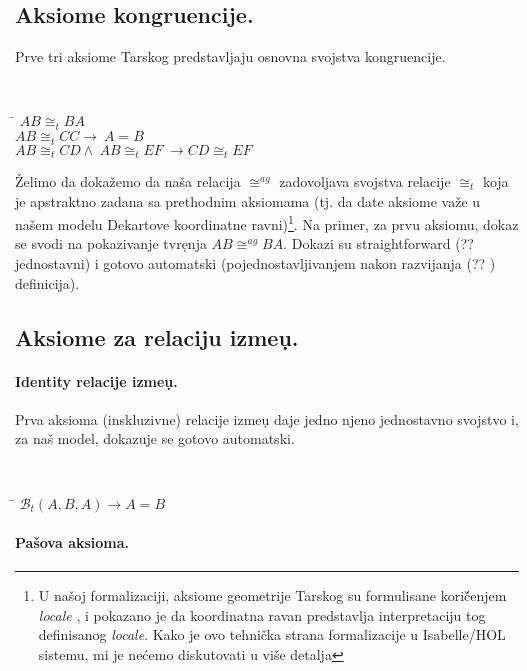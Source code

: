\documentclass[a4paper, 12pt]{article}
\newcommand{\agcongr}[4]{\ensuremath{#1#2 \cong^{ag} #3#4}}
\newcommand{\bett}[3]{\ensuremath{\mathcal{B}_t(#1, #2, #3)}}
\newcommand{\congrt}[4]{\ensuremath{#1#2 \cong_t #3#4}}
\begin{document}
\subsection{Aksiome kongruencije.}

Prve tri aksiome Tarskog predstavljaju osnovna svojstva kongruencije.
{\tt
\begin{tabbing}
\hspace{5mm}\=\kill
$\congrt{A}{B}{B}{A}$\\
$\congrt{A}{B}{C}{C} \longrightarrow\ A = B$\\
$\congrt{A}{B}{C}{D} \wedge\ \congrt{A}{B}{E}{F}\ \longrightarrow \congrt{C}{D}{E}{F}$
\end{tabbing}
}
\vspace{-2mm}

\v Zelimo da doka\v zemo da na\v sa relacija $\agcongr{}{}{}{}$ zadovoljava
svojstva relacije $\congrt{}{}{}{}$ koja je apstraktno zadana sa 
prethodnim aksiomama (tj. da date aksiome va\v ze u na\v sem modelu
Dekartove koordinatne ravni)\footnote{U na\v soj formalizaciji, aksiome geometrije
Tarskog su formulisane kori\v\'cenjem \emph{locale} \cite{locales},
i pokazano je da koordinatna ravan predstavlja interpretaciju 
tog definisanog \emph{locale}. Kako je ovo tehni\v cka strana formalizacije
u Isabelle/HOL sistemu, mi je ne\'cemo diskutovati u vi\v se detalja}.
Na primer, za prvu aksiomu, dokaz se svodi na pokazivanje tvr\d enja
\mbox{$\agcongr{A}{B}{B}{A}$}. Dokazi su {\lat straightforward} (?? jednostavni)
i gotovo automatski (pojednostavljivanjem nakon razvijanja (?? ) definicija). 

\subsection{Aksiome za relaciju izme\d u.}

\paragraph{{\lat Identity} relacije izme\d u.}

Prva aksioma (inskluzivne) relacije izme\d u daje jedno
njeno jednostavno svojstvo i, za na\v s model, dokazuje se gotovo automatski.

{\tt
\begin{tabbing}
\hspace{5mm}\=\kill
$\bett{A}{B}{A} \longrightarrow A = B$
\end{tabbing}
}

\paragraph{Pa\v sova aksioma.}
\end{document}
